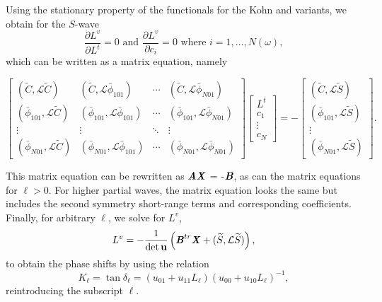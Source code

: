 \documentclass[preprint,showpacs,showkeys,preprintnumbers,amsmath,amssymb,longbibliography,pra,aps]{revtex4-1}
\begin{document}
{Using the stationary property of the functionals for the Kohn and variants, we obtain
for the $S$-wave
\begin{equation}
\frac{\partial L^v}{\partial L^t} = 0  \text{ and }
  \frac{\partial L^v}{\partial c_i} = 0 \text{ where $i = 1,\ldots,N(\omega)$},
\label{eq:ComplexKohnStationary}
\end{equation}
which can be written as a matrix equation, namely
\begin{widetext}
\begin{equation}
\label{eq:ComplexKohnMatrix}
\begin{bmatrix} 
 (\widetilde{C},\mathcal{L}\widetilde{C}) & (\widetilde{C},\mathcal{L}\bar{\phi}_{101}) & \cdots & (\widetilde{C},\mathcal{L}\bar{\phi}_{N01})\\
 (\bar{\phi}_{101},\mathcal{L}\widetilde{C}) & (\bar{\phi}_{101},\mathcal{L}\bar{\phi}_{101}) & \cdots & (\bar{\phi}_{101},\mathcal{L}\bar{\phi}_{N01})\\
 \vdots & \vdots & \ddots & \vdots \\
 (\bar{\phi}_{N01},\mathcal{L}\widetilde{C}) & (\bar{\phi}_{N01},\mathcal{L}\bar{\phi}_{101}) & \cdots & (\bar{\phi}_{N01},\mathcal{L}\bar{\phi}_{N01})
\end{bmatrix}
\begin{bmatrix}
L^t\\
c_1\\
\vdots\\
c_N
\end{bmatrix}
= -
\begin{bmatrix}
(\widetilde{C},\mathcal{L}\widetilde{S}) \\
(\bar{\phi}_{101},\mathcal{L}\widetilde{S}) \\
\vdots \\
(\bar{\phi}_{N01},\mathcal{L}\widetilde{S})
\end{bmatrix}.
\end{equation}
\end{widetext}
This matrix equation can be rewritten as
$\textbf{\emph{AX}}$ = -$\textbf{\emph{B}}$, as can the matrix equations
for $\ell > 0$. For higher partial waves,
the matrix equation looks the same but includes the second symmetry
short-range terms and corresponding coefficients. Finally, for arbitrary
$\ell$, we solve for $L^v$,
\begin{equation}
\label{eq:Lv}
L^v = -\frac{1}{\det \textbf{u}} \left( \textbf{\emph{B}}^{tr} \textbf{\emph{X}} +
  (\widetilde{S},\mathcal{L} \widetilde{S}) \right),
\end{equation}
to obtain the phase shifts by using the relation \cite{Lucchese1989}
\begin{equation}
\label{eq:GenKohnL}
K_\ell = \tan \delta_\ell = (u_{01} + u_{11} L_\ell)(u_{00} + u_{10}
  L_\ell)^{-1},
\end{equation}
reintroducing the subscript $\ell$.

}
\end{document}
